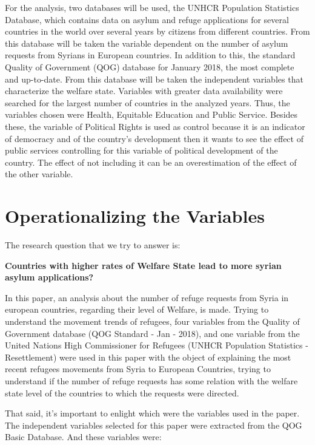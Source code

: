 \documentclass[]{elsarticle} %
\begin{document}
For the analysis, two databases will be used, the UNHCR Population
Statistics Database, which contains data on asylum and refuge
applications for several countries in the world over several years by
citizens from different countries. From this database will be taken the
variable dependent on the number of asylum requests from Syrians in
European countries. In addition to this, the standard Quality of
Government (QOG) database for January 2018, the most complete and
up-to-date. From this database will be taken the independent variables
that characterize the welfare state. Variables with greater data
availability were searched for the largest number of countries in the
analyzed years. Thus, the variables chosen were Health, Equitable
Education and Public Service. Besides these, the variable of Political
Rights is used as control because it is an indicator of democracy and of
the country's development then it wants to see the effect of public
services controlling for this variable of political development of the
country. The effect of not including it can be an overestimation of the
effect of the other variable.

\section{Operationalizing the
Variables}\label{operationalizing-the-variables}

The research question that we try to answer is:

\textbf{Countries with higher rates of Welfare State lead to more syrian
asylum applications?}

In this paper, an analysis about the number of refuge requests from
Syria in european countries, regarding their level of Welfare, is made.
Trying to understand the movement trends of refugees, four variables
from the Quality of Government database (QOG Standard - Jan - 2018), and
one variable from the United Nations High Commissioner for Refugees
(UNHCR Population Statistics - Resettlement) were used in this paper
with the object of explaining the most recent refugees movements from
Syria to European Countries, trying to understand if the number of
refuge requests has some relation with the welfare state level of the
countries to which the requests were directed.

That said, it's important to enlight which were the variables used in
the paper. The independent variables selected for this paper were
extracted from the QOG Basic Database. And these variables were:
\end{document}
